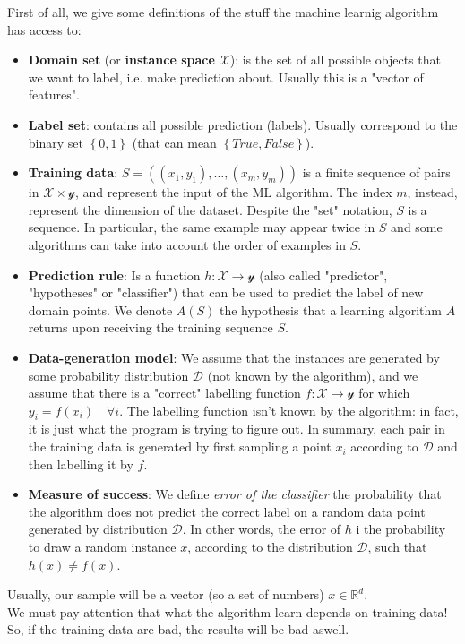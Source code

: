 \documentclass[12pt]{report}
\theoremstyle{plain}
\newcommand\mcl[1]{\mathcal{#1}}
\begin{document}
\begin{flushleft}
First of all, we give some definitions of the stuff the machine learnig algorithm has access to:
\begin{itemize}
\item \textbf{Domain set} (or \textbf{instance space} $\mcl{X}$): is the set of all possible objects that we want to label, i.e. make prediction about. Usually this is a "vector of features".
\item \textbf{Label set}: contains all possible prediction (labels). Usually correspond to the binary set $\left\{0,1\right\}$ (that can mean $\left\{True,False\right\}$).
\item \textbf{Training data}: $S=((x_1,y_1),\dots,(x_m,y_m))$ is a finite sequence of pairs in $\mcl{X}\times \mathcal{y}$, and represent the input of the ML algorithm. The index $m$, instead, represent the dimension of the dataset. Despite the "set" notation, $S$ is a sequence. In particular, the same example may appear twice in $S$ and some algorithms can take into account the order of examples in $S$.
\item \textbf{Prediction rule}: Is a function $h:\mcl{X}\to\mcl{y}$ (also called "predictor", "hypotheses" or "classifier") that can be used to predict the label of new domain points. We denote $A(S)$ the hypothesis that a learning algorithm $A$ returns upon receiving the training sequence $S$.
\item \textbf{Data-generation model}: We assume that the instances are generated by some probability distribution $\mcl{D}$ (not known by the algorithm), and we assume that there is a "correct" labelling function $f:\mcl{X}\to\mcl{y}$ for which $y_i = f(x_i) \quad \forall i$. The labelling function isn't known by the algorithm: in fact, it is just what the program is trying to figure out. In summary, each pair in the training data is generated by first sampling a point $x_i$ according to $\mcl{D}$ and then labelling it by $f$.
\item \textbf{Measure of success}: We define \textit{error of the classifier} the probability that the algorithm does not predict the correct label on a random data point generated by distribution $\mcl{D}$. In other words, the error of $h$ i the probability to draw a random instance $x$, according to the distribution $\mcl{D}$, such that $h(x) \neq f(x)$.
\end{itemize}

Usually, our sample will be a vector (so a set of numbers) $x\in\mathds{R}^d$.\\
We must pay attention that what the algorithm learn depends on training data! So, if the training data are bad, the results will be bad aswell.


\end{flushleft}
\end{document}
